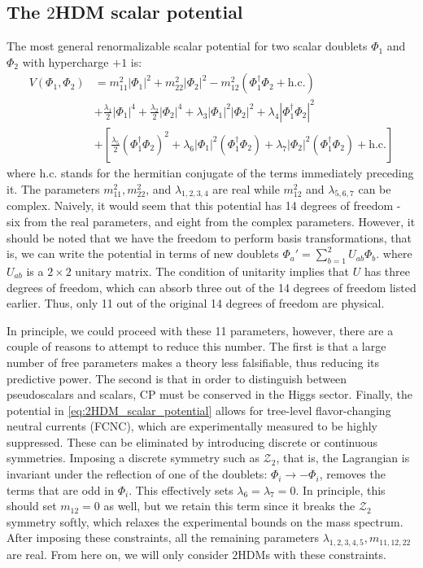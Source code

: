 \subsection{The $2$HDM scalar potential}
The most general renormalizable scalar potential for two scalar doublets $\Phi_1$ and $\Phi_2$ with hypercharge $+1$ is:
\strictpagecheck
{}
\begin{align*}
  V(\Phi_1,\Phi_2) &= m_{11}^2|\Phi_1|^2 + m_{22}^2|\Phi_2|^2 - m_{12}^2\left(\Phi_1^\dagger\Phi_2 + \text{h.c.}\right)\\
&+\frac{\lambda_1}{2}|\Phi_1|^4 + \frac{\lambda_2}{2}|\Phi_2|^4+\lambda_3|\Phi_1|^2|\Phi_2|^2 + \lambda_4|\Phi_1^\dagger\Phi_2|^2\\
&+\left[\frac{\lambda_5}{2}\left(\Phi_1^\dagger\Phi_2 \right)^2+\lambda_6|\Phi_1|^2(\Phi_1^\dagger\Phi_2)+\lambda_7|\Phi_2|^2(\Phi_1^\dagger\Phi_2) + \text{h.c.}\right]
\label{eq:2HDM_scalar_potential}
\end{align*}
where h.c. stands for the hermitian conjugate of the terms immediately preceding it. The parameters $m_{11}^2, m_{22}^2$, and $\lambda_{1,2,3,4}$ are real while $m_{12}^2$ and $\lambda_{5,6,7}$ can be complex. Naively, it would seem that this potential has 14 degrees of freedom - six from the real parameters, and eight from the complex parameters. However, it should be noted that we have the freedom to perform basis transformations, that is, we can write the potential in terms of new doublets $\Phi_a' = \sum_{b=1}^2U_{ab}\Phi_b$. where $U_{ab}$ is a $2\times 2$ unitary matrix. The condition of unitarity implies that $U$ has three degrees of freedom, which can absorb three out of the 14 degrees of freedom listed earlier. Thus, only 11 out of the original 14 degrees of freedom are physical.

In principle, we could proceed with these 11 parameters, however, there are a couple of reasons to attempt to reduce this number. The first is that a large number of free parameters makes a theory less falsifiable, thus reducing its predictive power. The second is that in order to distinguish between pseudoscalars and scalars, CP must be conserved in the Higgs sector. Finally, the potential in \eqref{eq:2HDM_scalar_potential} allows for tree-level flavor-changing neutral currents (FCNC), which are experimentally measured to be highly suppressed. These can be eliminated by introducing discrete or continuous symmetries. Imposing a discrete symmetry such as $\mathcal{Z}_2$, that is, the Lagrangian is invariant under the reflection of one of the doublets: $\Phi_i\rightarrow-\Phi_i$, removes the terms that are odd in $\Phi_i$. This effectively sets $\lambda_6=\lambda_7 = 0$. In principle, this should set $m_{12} = 0$ as well, but we retain this term since it breaks the $\mathcal{Z}_2$ symmetry softly, which relaxes the experimental bounds on the mass spectrum.
After imposing these constraints, all the remaining parameters $\lambda_{1,2,3,4,5}, m_{11,12,22}$ are real. From here on, we will only consider $2$HDMs with these constraints. 

